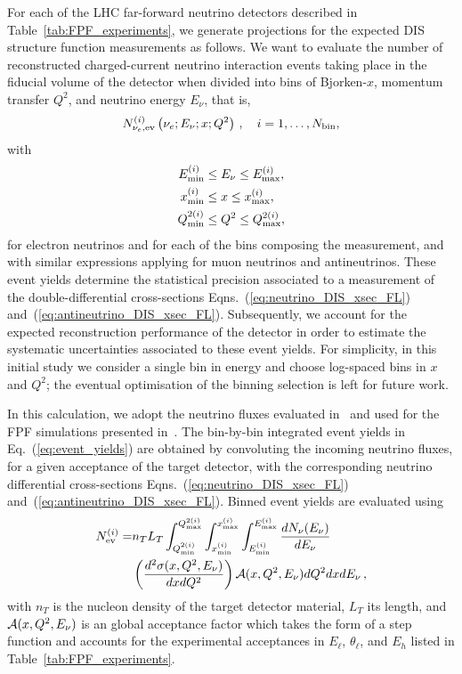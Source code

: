 For each of the LHC far-forward neutrino detectors
described in Table~\ref{tab:FPF_experiments}, we generate
projections for the expected DIS structure function
measurements as follows.
%
We want to evaluate the number of reconstructed charged-current neutrino interaction
events taking place in the fiducial volume of the detector when divided into bins of Bjorken-$x$,
momentum transfer $Q^2$, and neutrino energy $E_\nu$, that is,
\begin{align}
	\label{eq:event_yields}
	N_{\nu_e,{\rm ev}}^{(i)}\left( \nu_e ;  E_\nu; x; Q^2\right)
	\, ,\quad i=1,\ldots, N_{\rm bin},
\end{align}
with
\allowdisplaybreaks
\begin{align}
	E_{{\rm min}}^{(i)} &\le E_\nu \le E_{{\rm max}}^{(i)}, \nonumber \\
	x_{{\rm min}}^{(i)} &\le x \le x_{{\rm max}}^{(i)} , \nonumber \\
	Q_{{\rm min}}^{2(i)} & \le Q^2 \le Q_{{\rm max}}^{2(i)}, \nonumber
\end{align}
\allowdisplaybreaks
for electron neutrinos and for each of the bins composing the measurement, and with similar
expressions applying for muon neutrinos and antineutrinos.
%
These event yields determine the statistical
precision associated to a measurement of the double-differential cross-sections
Eqns.~(\ref{eq:neutrino_DIS_xsec_FL}) and~(\ref{eq:antineutrino_DIS_xsec_FL}).
%
Subsequently, we account for the expected reconstruction performance of the detector
in order to estimate the systematic uncertainties associated to these event yields.
%
For simplicity, in this initial study we consider a single bin in energy
and choose log-spaced bins in $x$ and $Q^2$; the eventual optimisation
of the binning selection is left for future work.

In this calculation, we adopt the neutrino fluxes evaluated in~\cite{Kling:2021gos} and used
for the FPF simulations presented in~\cite{Feng:2022inv}.
%
The bin-by-bin integrated event yields in Eq.~(\ref{eq:event_yields}) are
obtained by convoluting the incoming neutrino fluxes, for a given acceptance
of the target detector, with the corresponding neutrino differential cross-sections
Eqns.~(\ref{eq:neutrino_DIS_xsec_FL}) and~(\ref{eq:antineutrino_DIS_xsec_FL}).
%
Binned event yields are evaluated using
\begin{align}
  \label{eq:event_yields_calculation}
   N_{\rm ev}^{(i)} =& n_T L_T\int_{Q^{2(i)}_{\rm min}}^{Q^{2(i)}_{\rm max}}\int_{x^{(i)}_{\rm min}}^{x^{(i)}_{\rm max}}\int_{E_{\rm min}^{(i)}}^{E_{\rm max}^{(i)}} \frac{dN_{\nu}(E_\nu)}{dE_{\nu}} \\ 
   &\left(\frac{d^2\sigma(x,Q^2,E_{\nu})}{dxdQ^2}\right) {\cal A}(x,Q^2,E_{\nu}) dQ^2 dx dE_{\nu} \, , \nonumber
\end{align}
with $n_T$ is the nucleon density of the target detector material, $L_T$ its
length, and ${\cal A}(x,Q^2,E_{\nu})$ is an global acceptance factor which takes the form of a
step function and accounts for the experimental acceptances
in $E_\ell$, $\theta_\ell$, and $E_h$
listed in Table~\ref{tab:FPF_experiments}.


